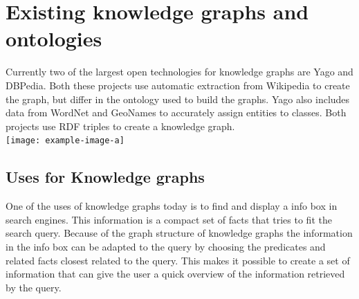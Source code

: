 \section{Existing knowledge graphs and ontologies}
Currently two of the largest open technologies for knowledge graphs are Yago and DBPedia. Both these projects use automatic extraction from Wikipedia to create the graph, but differ in the ontology used to build the graphs. Yago also includes data from WordNet and GeoNames to accurately assign entities to classes. Both projects use RDF triples to create a knowledge graph.\\


\texttt{[image: example-image-a]}\\
\subsection{Uses for Knowledge graphs}
One of the uses of knowledge graphs today is to find and display a info box in search engines. This information is a compact set of facts that tries to fit the search query. Because of the graph structure of knowledge graphs the information in the info box can be adapted to the query by choosing the predicates and related facts closest related to the query. This makes it possible to create a set of information that can give the user a quick overview of the information retrieved by the query.\\

